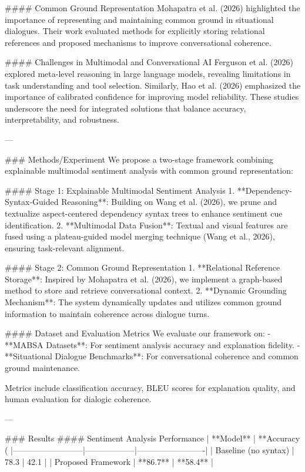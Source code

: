 #### Common Ground Representation
Mohapatra et al. (2026) highlighted the importance of representing and maintaining common ground in situational dialogues. Their work evaluated methods for explicitly storing relational references and proposed mechanisms to improve conversational coherence.

#### Challenges in Multimodal and Conversational AI
Ferguson et al. (2026) explored meta-level reasoning in large language models, revealing limitations in task understanding and tool selection. Similarly, Hao et al. (2026) emphasized the importance of calibrated confidence for improving model reliability. These studies underscore the need for integrated solutions that balance accuracy, interpretability, and robustness.

---

### Methods/Experiment
We propose a two-stage framework combining explainable multimodal sentiment analysis with common ground representation:

#### Stage 1: Explainable Multimodal Sentiment Analysis
1. **Dependency-Syntax-Guided Reasoning**: Building on Wang et al. (2026), we prune and textualize aspect-centered dependency syntax trees to enhance sentiment cue identification.
2. **Multimodal Data Fusion**: Textual and visual features are fused using a plateau-guided model merging technique (Wang et al., 2026), ensuring task-relevant alignment.

#### Stage 2: Common Ground Representation
1. **Relational Reference Storage**: Inspired by Mohapatra et al. (2026), we implement a graph-based method to store and retrieve conversational context.
2. **Dynamic Grounding Mechanism**: The system dynamically updates and utilizes common ground information to maintain coherence across dialogue turns.

#### Dataset and Evaluation Metrics
We evaluate our framework on:
- **MABSA Datasets**: For sentiment analysis accuracy and explanation fidelity.
- **Situational Dialogue Benchmarks**: For conversational coherence and common ground maintenance.

Metrics include classification accuracy, BLEU scores for explanation quality, and human evaluation for dialogic coherence.

---

### Results
#### Sentiment Analysis Performance
| **Model**               | **Accuracy (%
|--------------------------|------------------|-------------------------|  
| Baseline (no syntax)     | 78.3             | 42.1                    |  
| Proposed Framework       | **86.7**         | **58.4**                |  

